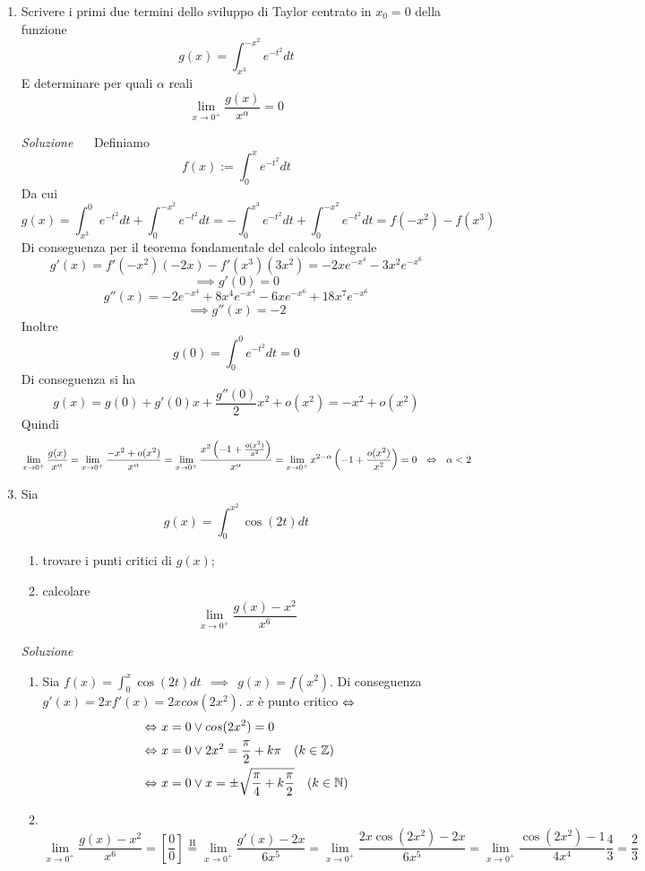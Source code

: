 \documentclass{article}
\begin{document}
\begin{enumerate}[label=\textbf{Esercizio 10.\arabic*.},itemindent=*]
\begin{proof}
    Perchè gli altri due integrali sono non negativi per ipotesi.
    \[\int_{x_0-\delta}^{x_0+\delta}f(x)dx=\sup s(\mathcal{D},f)\geq2\delta \inf_{[x_0-\delta, x_0+\delta]}f=2\delta \inf_{[x_0-\delta, x_0+\delta]}f>0\]
    Assurdo
\end{proof}
\item Scrivere i primi due termini dello sviluppo di Taylor centrato in $x_0=0$ della funzione
\[g(x)=\int_{x^3}^{-x^2}e^{-t^2}dt\]
E determinare per quali $\alpha$ reali 
\[\lim_{x\to0^+}\frac{g(x)}{x^\alpha}=0\]
\item[\textit{\large Soluzione~}]~
Definiamo 
\[f(x):=\int_0^xe^{-t^2}dt\]
Da cui
\[g(x)=\int_{x^3}^0e^{-t^2}dt+\int^{-x^2}_0e^{-t^2}dt=-\int^{x^3}_0e^{-t^2}dt+\int^{-x^2}_0e^{-t^2}dt=f(-x^2)-f(x^3)\]
Di conseguenza per il teorema fondamentale del calcolo integrale
\[g'(x)=f'(-x^2)(-2x)-f'(x^3)(3x^2)=-2xe^{-x^4}-3x^2e^{-x^6}\]
\[\implies g'(0)=0\]
\[g''(x)=-2e^{-x^4}+8x^4e^{-x^4}-6x{e^{-x^6}}+18x^7e^{-x^6}\]
\[\implies g''(x)=-2\]
Inoltre
\[g(0)=\int_{0}^{0}e^{-t^2}dt=0\]
Di conseguenza si ha \[g(x)=g(0)+g'(0)x+\frac{g''(0)}{2}x^2+o(x^2)=-x^2+o(x^2)\tag{$x\to0$}\]
Quindi
\[\lim_{x\to0^+}\frac{g(x)}{x^\alpha}=\lim_{x\to 0^+}\frac{-x^2+o(x^2)}{x^\alpha}=\lim_{x\to 0^+}\frac{x^2\left(-1+\frac{o(x^2)}{x^2}\right)}{x^\alpha}=\lim_{x\to 0^+}x^{2-\alpha}\left(-1+\frac{o(x^2)}{x^2}\right)=0~~\Leftrightarrow~~\alpha<2\]
\item Sia 
\[g(x)=\int_0^{x^2}\cos(2t)dt\]
\begin{enumerate}
    \item trovare i punti critici di $g(x)$;
    \item calcolare 
    \[\lim_{x\to0^+}\frac{g(x)-x^2}{x^6}\]
\end{enumerate}
\item[\textit{\large Soluzione~}]~
\begin{enumerate}
    \item Sia $f(x)=\int_0^{x}\cos(2t)dt~~\implies~~g(x)=f(x^2)$. Di conseguenza $g'(x)=2xf'(x)=2xcos(2x^2)$. $x$ è punto critico $\Leftrightarrow$
    \[\begin{align}
        \Leftrightarrow~& x=0\lor cos(2x^2)=0\\
        \Leftrightarrow~& x=0\lor 2x^2=\frac{\pi}{2}+k\pi ~~~(k\in \mathbb{Z})\\
        \Leftrightarrow~& x=0\lor x=\pm\sqrt{\frac{\pi}{4}+k\frac{\pi}{2}} ~~~(k\in \mathbb{N})
    \end{align}\]
    \item ~\[\lim_{x\to0^+}\frac{g(x)-x^2}{x^6}=\left[\frac{0}{0}\right]\overset{\text{H}}{=}\lim_{x\to0^+}\frac{g'(x)-2x}{6x^5}=\lim_{x\to0^+}\frac{2x\cos (2x^2)-2x}{6x^5}=\lim_{x\to0^+}\frac{\cos(2x^2)-1}{4x^4}\frac{4}{3}=\frac{2}{3}\]
\end{enumerate}


\end{enumerate}
\end{document}
